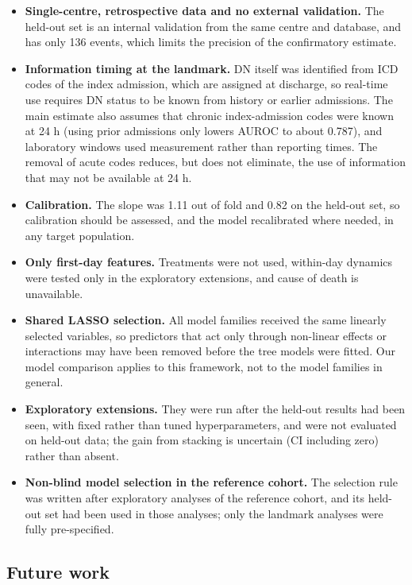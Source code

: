 \begin{itemize}
\tightlist
\item
  \textbf{Single-centre, retrospective data and no external validation.} The
  held-out set is an internal validation from the same centre and database, and
  has only 136 events, which limits the precision of the confirmatory estimate.
\item
  \textbf{Information timing at the landmark.} DN itself was identified from ICD
  codes of the index admission, which are assigned at discharge, so real-time
  use requires DN status to be known from history or earlier admissions. The
  main estimate also assumes that chronic index-admission codes were known at 24
  h (using prior admissions only lowers AUROC to about 0.787), and laboratory
  windows used measurement rather than reporting times. The removal of acute
  codes reduces, but does not eliminate, the use of information that may not be
  available at 24 h.
\item
  \textbf{Calibration.} The slope was 1.11 out of fold and 0.82 on the held-out
  set, so calibration should be assessed, and the model recalibrated where
  needed, in any target population.
\item
  \textbf{Only first-day features.} Treatments were not used, within-day
  dynamics were tested only in the exploratory extensions, and cause of death is
  unavailable.
\item
  \textbf{Shared LASSO selection.} All model families received the same linearly
  selected variables, so predictors that act only through non-linear effects or
  interactions may have been removed before the tree models were fitted. Our
  model comparison applies to this framework, not to the model families in
  general.
\item
  \textbf{Exploratory extensions.} They were run after the held-out results had
  been seen, with fixed rather than tuned hyperparameters, and were not
  evaluated on held-out data; the gain from stacking is uncertain (CI including
  zero) rather than absent.
\item
  \textbf{Non-blind model selection in the reference cohort.} The selection rule
  was written after exploratory analyses of the reference cohort, and its
  held-out set had been used in those analyses; only the landmark analyses were
  fully pre-specified.
\end{itemize}

\hypertarget{future-work}{%
\subsection{Future work}\label{future-work}}

